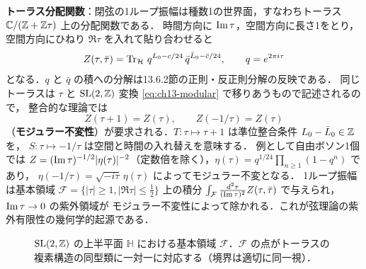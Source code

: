 \textbf{トーラス分配関数}：閉弦の1ループ振幅は種数1の世界面，すなわちトーラス $\mathbb{C}/(\mathbb{Z}+\mathbb{Z}\tau)$ 上の分配関数である．
時間方向に $\operatorname{Im}\tau$，空間方向に長さ1をとり，空間方向にひねり $\Re\tau$ を入れて貼り合わせると
\begin{equation}
  Z(\tau,\bar\tau) = \operatorname{Tr}_{\mathcal{H}}\, q^{L_0-c/24}\,\bar q^{\bar L_0-\bar c/24},\qquad q=e^{2\pi i\tau}
\end{equation}
となる．$q$ と $\bar q$ の積への分解は13.6.2節の正則・反正則分解の反映である．
同じトーラスは $\tau$ と $\operatorname{SL}(2,\mathbb{Z})$ 変換 \eqref{eq:ch13-modular} で移りあうもので記述されるので，
整合的な理論では
\begin{equation}
  Z(\tau+1) = Z(\tau),\qquad Z(-1/\tau)=Z(\tau)
\end{equation}
（\textbf{モジュラー不変性}）が要求される．$T:\tau\mapsto\tau+1$ は準位整合条件 $L_0-\bar L_0\in\mathbb{Z}$ を，
$S:\tau\mapsto-1/\tau$ は空間と時間の入れ替えを意味する．
例として自由ボソン1個では $Z = (\operatorname{Im}\tau)^{-1/2}|\eta(\tau)|^{-2}$（定数倍を除く），$\eta(\tau)=q^{1/24}\prod_{n\geq1}(1-q^n)$ であり，
$\eta(-1/\tau)=\sqrt{-i\tau}\,\eta(\tau)$ によってモジュラー不変となる．
1ループ振幅は基本領域 $\mathcal{F}=\{|\tau|\geq1,|\Re\tau|\leq\tfrac12\}$ 上の積分
$\int_{\mathcal{F}}\frac{d^2\tau}{(\operatorname{Im}\tau)^2}Z(\tau,\bar\tau)$ で与えられ，$\operatorname{Im}\tau\to 0$ の紫外領域が
モジュラー不変性によって除かれる．これが弦理論の紫外有限性の幾何学的起源である．

\begin{figure}[ht]
\centering
{}
\caption{$\operatorname{SL}(2,\mathbb{Z})$ の上半平面 $\mathbb{H}$ における基本領域 $\mathcal{F}$．$\mathcal{F}$ の点がトーラスの複素構造の同型類に一対一に対応する（境界は適切に同一視）．}
\end{figure}

